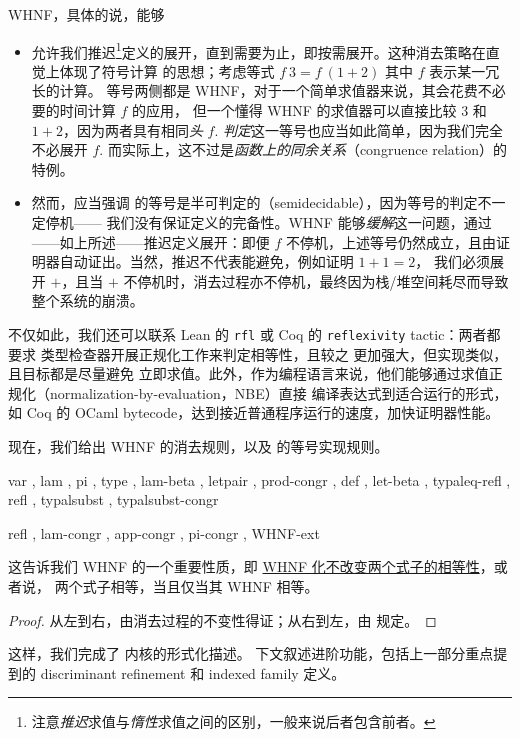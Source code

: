 \documentclass[a4paper, 11pt]{article}
\theoremstyle{remark}\newtheorem*{remark}{Remark}
\theoremstyle{definition}\newtheorem*{definition}{Definition}
\begin{document}
WHNF，具体的说，能够
\begin{itemize}
\item 允许我们推迟\footnote{
注意\emph{推迟}求值与\emph{惰性}求值之间的区别，一般来说后者包含前者。
}定义的展开，直到需要为止，即按需展开。这种消去策略在直觉上体现了符号计算
的思想；考虑等式 $f\ 3 = f\ (1 + 2)$ 其中 $f$ 表示某一冗长的计算。
等号两侧都是 WHNF，对于一个简单求值器来说，其会花费不必要的时间计算 $f$ 的应用，
但一个懂得 WHNF 的求值器可以直接比较 $3$ 和 $1 + 2$，因为两者具有相同\emph{头} $f$.
\emph{判定}这一等号也应当如此简单，因为我们完全不必展开 $f$.
而实际上，这不过是\emph{函数上的同余关系}（congruence relation）的特例。

\item 然而，应当强调 \Tigrisd 的等号是半可判定的（semidecidable），因为等号的判定不一定停机——
我们没有保证定义的完备性。WHNF 能够\emph{缓解}这一问题，通过——如上所述——推迟定义展开：即便 $f$
不停机，上述等号仍然成立，且由证明器自动证出。当然，推迟不代表能避免，例如证明 $1 + 1 = 2$，
我们必须展开 $+$，且当 $+$ 不停机时，消去过程亦不停机，最终因为栈/堆空间耗尽而导致整个系统的崩溃。

\end{itemize}

不仅如此，我们还可以联系 Lean 的 \texttt{rfl} 或 Coq 的 \texttt{reflexivity} tactic：两者都要求
类型检查器开展正规化工作来判定相等性，且较之 \Tigrisd 更加强大，但实现类似，且目标都是尽量避免
立即求值。此外，作为编程语言来说，他们能够通过求值正规化（normalization-by-evaluation，NBE）直接
编译表达式到适合运行的形式，如 Coq 的 OCaml bytecode，达到接近普通程序运行的速度，加快证明器性能。

现在，我们给出 WHNF 的消去规则，以及 \Tigrisd 的等号实现规则。

{ var
, lam
, pi
, type
, lam-beta
, letpair
, prod-congr
, def
, let-beta
, typaleq-refl
, refl
, typalsubst
, typalsubst-congr}

{ refl
, lam-congr
, app-congr
, pi-congr
, WHNF-ext}

这告诉我们 WHNF 的一个重要性质，即 \underline{WHNF 化不改变两个式子的相等性}，或者说，
两个式子相等，当且仅当其 WHNF 相等。
\begin{proof}
从左到右，由消去过程的不变性得证；从右到左，由  规定。
\end{proof}

这样，我们完成了 \Tigrisd 内核的形式化描述。
下文叙述进阶功能，包括上一部分重点提到的 discriminant refinement 和 indexed family 定义。
\end{document}
